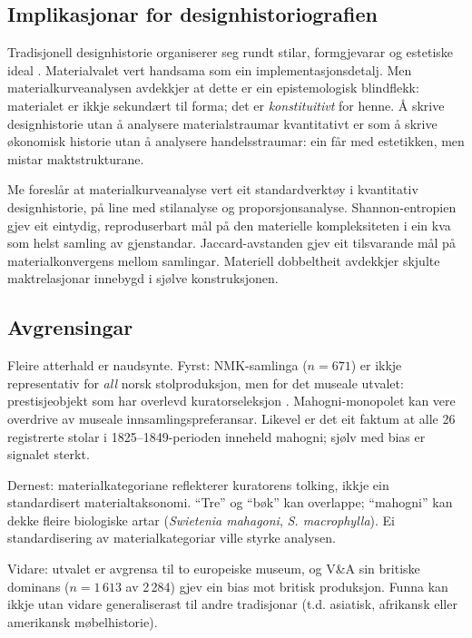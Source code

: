 \documentclass[10pt, a4paper, twocolumn]{article}
\begin{document}
\subsection{Implikasjonar for designhistoriografien}

Tradisjonell designhistorie organiserer seg rundt stilar, formgjevarar og estetiske ideal \citep{lucie-smith1993, raizman2010}. Materialvalet vert handsama som ein implementasjonsdetalj. Men materialkurveanalysen avdekkjer at dette er ein epistemologisk blindflekk: materialet er ikkje sekundært til forma; det er \emph{konstituitivt} for henne. Å skrive designhistorie utan å analysere materialstraumar kvantitativt er som å skrive økonomisk historie utan å analysere handelsstraumar: ein får med estetikken, men mistar maktstrukturane.

Me foreslår at materialkurveanalyse vert eit standardverktøy i kvantitativ designhistorie, på line med stilanalyse og proporsjonsanalyse. Shannon-entropien gjev eit eintydig, reproduserbart mål på den materielle kompleksiteten i ein kva som helst samling av gjenstandar. Jaccard-avstanden gjev eit tilsvarande mål på materialkonvergens mellom samlingar. Materiell dobbeltheit avdekkjer skjulte maktrelasjonar innebygd i sjølve konstruksjonen.

\subsection{Avgrensingar}

Fleire atterhald er naudsynte. Fyrst: NMK-samlinga ($n = 671$) er ikkje representativ for \emph{all} norsk stolproduksjon, men for det museale utvalet: prestisje\-objekt som har overlevd kuratorseleksjon \citep[jf.][]{bennett1995}. Mahogni-monopolet kan vere overdrive av museale innsamlingspreferansar. Likevel er det eit faktum at alle 26 registrerte stolar i 1825--1849-perioden inneheld mahogni; sjølv med bias er signalet sterkt.

Dernest: materialkategoriane reflekterer kuratorens tolking, ikkje ein standardisert materialtaksonomi. ``Tre'' og ``bøk'' kan overlappe; ``mahogni'' kan dekke fleire biologiske artar (\emph{Swietenia mahagoni}, \emph{S. macrophylla}). Ei standardisering av materialkategoriar ville styrke analysen.

Vidare: utvalet er avgrensa til to europeiske museum, og V\&A sin britiske dominans ($n = 1\,613$ av 2\,284) gjev ein bias mot britisk produksjon. Funna kan ikkje utan vidare generaliserast til andre tradisjonar (t.d. asiatisk, afrikansk eller amerikansk møbelhistorie).
\end{document}
